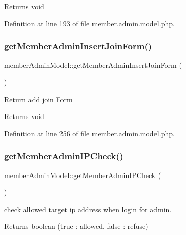\begin{DoxyReturn}{Returns}
void 
\end{DoxyReturn}


Definition at line 193 of file member.\+admin.\+model.\+php.

\mbox{\label{classmemberAdminModel_a5cd67d34e825a2afa0fb871bd10aadb9}} 
\subsubsection{\texorpdfstring{get\+Member\+Admin\+Insert\+Join\+Form()}{getMemberAdminInsertJoinForm()}}
{\footnotesize\ttfamily member\+Admin\+Model\+::get\+Member\+Admin\+Insert\+Join\+Form (\begin{DoxyParamCaption}{ }\end{DoxyParamCaption})}

Return add join Form

\begin{DoxyReturn}{Returns}
void 
\end{DoxyReturn}


Definition at line 256 of file member.\+admin.\+model.\+php.

\mbox{\label{classmemberAdminModel_a26f6b31630804f56a79156f59c0f7603}} 
\subsubsection{\texorpdfstring{get\+Member\+Admin\+I\+P\+Check()}{getMemberAdminIPCheck()}}
{\footnotesize\ttfamily member\+Admin\+Model\+::get\+Member\+Admin\+I\+P\+Check (\begin{DoxyParamCaption}{ }\end{DoxyParamCaption})}

check allowed target ip address when login for admin.

\begin{DoxyReturn}{Returns}
boolean (true \+: allowed, false \+: refuse) 
\end{DoxyReturn}


